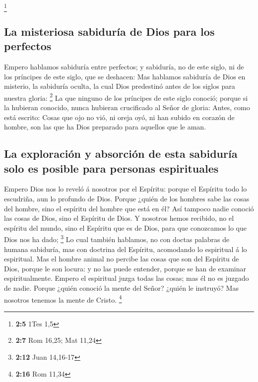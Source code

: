 \footnote{\textbf{2:5} 1Tes 1,5}

\hypertarget{la-misteriosa-sabiduruxeda-de-dios-para-los-perfectos}{%
\subsection{La misteriosa sabiduría de Dios para los
perfectos}\label{la-misteriosa-sabiduruxeda-de-dios-para-los-perfectos}}

 Empero hablamos sabiduría entre perfectos; y sabiduría, no
de este siglo, ni de los príncipes de este siglo, que se deshacen:
 Mas hablamos sabiduría de Dios en misterio, la sabiduría
oculta, la cual Dios predestinó antes de los siglos para nuestra gloria:
\footnote{\textbf{2:7} Rom 16,25; Mat 11,24}  La que ninguno
de los príncipes de este siglo conoció; porque si la hubieran conocido,
nunca hubieran crucificado al Señor de gloria:  Antes, como
está escrito: Cosas que ojo no vió, ni oreja oyó, ni han subido en
corazón de hombre, son las que ha Dios preparado para aquellos que le
aman.

\hypertarget{la-exploraciuxf3n-y-absorciuxf3n-de-esta-sabiduruxeda-solo-es-posible-para-personas-espirituales}{%
\subsection{La exploración y absorción de esta sabiduría solo es posible
para personas
espirituales}\label{la-exploraciuxf3n-y-absorciuxf3n-de-esta-sabiduruxeda-solo-es-posible-para-personas-espirituales}}

 Empero Dios nos lo reveló á nosotros por el Espíritu:
porque el Espíritu todo lo escudriña, aun lo profundo de Dios.
 Porque ¿quién de los hombres sabe las cosas del hombre,
sino el espíritu del hombre que está en él? Así tampoco nadie conoció
las cosas de Dios, sino el Espíritu de Dios.  Y nosotros
hemos recibido, no el espíritu del mundo, sino el Espíritu que es de
Dios, para que conozcamos lo que Dios nos ha dado; \footnote{\textbf{2:12}
  Juan 14,16-17}  Lo cual también hablamos, no con doctas
palabras de humana sabiduría, mas con doctrina del Espíritu, acomodando
lo espiritual á lo espiritual.  Mas el hombre animal no
percibe las cosas que son del Espíritu de Dios, porque le son locura: y
no las puede entender, porque se han de examinar espiritualmente.
 Empero el espiritual juzga todas las cosas; mas él no es
juzgado de nadie.  Porque ¿quién conoció la mente del
Señor? ¿quién le instruyó? Mas nosotros tenemos la mente de Cristo.
\footnote{\textbf{2:16} Rom 11,34}


